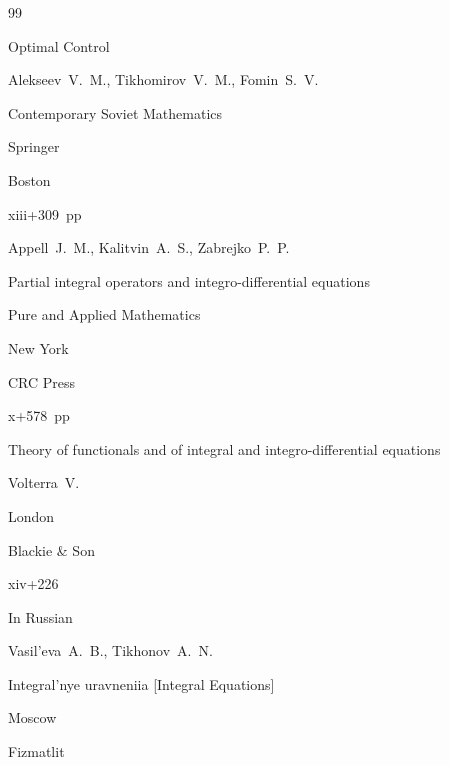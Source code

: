 \begin{thebibliography}{99}




\book Optimal Control


\by Alekseev~V.~M., Tikhomirov~V.~M., Fomin~S.~V. 

\serial Contemporary Soviet Mathematics 

\publ Springer

\publaddr Boston

\totalpages xiii+309~pp \nofrills







\by Appell~J.~M., Kalitvin~A.~S., Zabrejko~P.~P.

\book Partial integral operators and integro-differential equations

\serial Pure and Applied Mathematics

\publaddr New York

\publ CRC Press


\totalpages x+578~pp \nofrills





\book Theory of functionals and of integral and integro-differential equations

\by Volterra~V.

\publaddr London  

\publ Blackie  \& Son


\totalpages xiv+226







\lang In Russian

\by Vasil'eva~A.~B., Tikhonov~A.~N.

\book Integral'nye uravneniia \rm [Integral Equations]

\publaddr Moscow

\publ Fizmatlit



\end{thebibliography}
